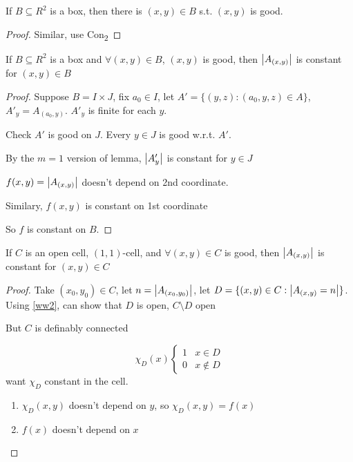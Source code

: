 \documentclass[11pt]{article}
\begin{document}
\begin{lemma}[]
If \(B\subseteq R^2\) is a box, then there is \((x,y)\in B\) s.t. \((x,y)\) is good.
\end{lemma}

\begin{proof}
Similar, use Con\textsubscript{2}
\end{proof}

\begin{lemma}[]
\label{ww2}
If \(B\subseteq R^2\) is a box and \(\forall(x,y)\in B\), \((x,y)\) is good, then \(\abs{A_{(x,y)}}\) is constant
for \((x,y)\in B\)
\end{lemma}

\begin{proof}
Suppose \(B=I\times J\), fix \(a_0\in I\),
let \(A'=\{(y,z):(a_0,y,z)\in A\}\), \(A'_y=A_{(a_0,y)}\). \(A'_y\) is finite for each \(y\).

Check \(A'\) is good on \(J\). Every \(y\in J\) is good w.r.t. \(A'\).

By the \(m=1\) version of lemma, \(\abs{A'_y}\) is constant for \(y\in J\)

\(f(x,y)=\abs{A_{(x,y)}}\) doesn't depend on 2nd coordinate.

Similary, \(f(x,y)\) is constant on 1st coordinate

So \(f\) is constant on \(B\).
\end{proof}

\begin{lemma}[]
If \(C\) is an open cell, \((1,1)\)-cell, and \(\forall(x,y)\in C\) is good, then \(\abs{A_{(x,y)}}\) is
constant for \((x,y)\in C\)
\end{lemma}

\begin{proof}
Take \((x_0,y_0)\in C\), let \(n=\abs{A_{(x_0,y_0)}}\), let \(D=\{(x,y)\in C:\abs{A_{(x,y)}=n}\}\).
Using \ref{ww2}, can show that \(D\) is open, \(C\setminus D\) open

But \(C\) is definably connected

\begin{equation*}
\chi_D(x)
\begin{cases}
1&x\in D\\
0&x\notin D
\end{cases}
\end{equation*}
want \(\chi_D\) constant in the cell.
\begin{enumerate}
\item \(\chi_D(x,y)\) doesn't depend on \(y\), so \(\chi_D(x,y)=f(x)\)
\item \(f(x)\) doesn't depend on \(x\)
\end{enumerate}
\end{proof}
\end{document}
